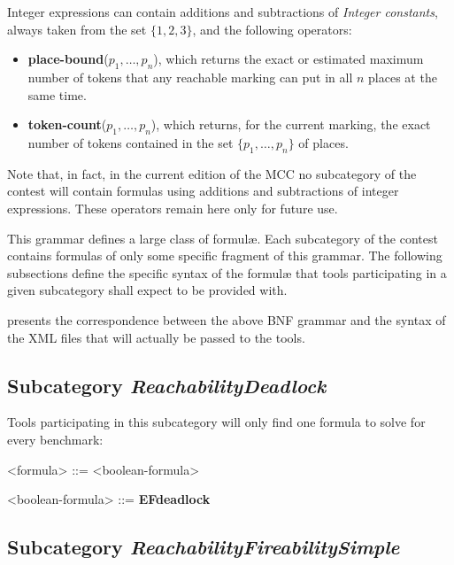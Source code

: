 \documentclass[10pt,english,a4paper]{article}
\newcommand\set[1]           {{\{ #1 \mathclose \}}}
\newcommand\ctle             {\textbf{E}\xspace}
\newcommand\ltlf             {\textbf{F}\xspace}
\newcommand\atomdead         {\textbf{deadlock}\xspace}
\newcommand\atomplacebnd[1]  {\textbf{place-bound}(#1)}
\newcommand\atomtokenscnt[1] {\textbf{token-count}(#1)}
\newcommand{\mcc}[0]{MCC}
\begin{document}
Integer expressions can contain additions and subtractions of
\emph{Integer constants}, always taken from the set $\set{1, 2, 3}$, and
the following operators:
\begin{itemize}
\item
  \atomplacebnd{$p_1, \ldots, p_n$}, which returns the exact or estimated
  maximum number of tokens that any reachable marking can put in all $n$
  places at the same time.
\item
  \atomtokenscnt{$p_1, \ldots, p_n$}, which returns, for the current
  marking, the exact number of tokens contained in the set
  $\set{p_1, \ldots, p_n}$ of places.
\end{itemize}
Note that, in fact, in the current edition of the \mcc{} no subcategory of the
contest will contain formulas using additions and subtractions of integer
expressions. These operators remain here only for future use.


This grammar defines a large class of formulæ.
Each subcategory of the contest contains formulas of only some specific
fragment of this grammar.
The following subsections define the specific syntax of the formul\ae{}
that tools participating in a given subcategory shall expect to be provided
with.

 presents the correspondence between the above BNF grammar
and the syntax of the XML files that will actually be passed to the tools.

\subsection{Subcategory \textit{ReachabilityDeadlock}}

Tools participating in this subcategory will only find one formula to solve
for every benchmark:

\begin{grammar}

<formula> ::= <boolean-formula>

<boolean-formula> ::= \ctle \ltlf \atomdead

\end{grammar}

\subsection{Subcategory \textit{ReachabilityFireabilitySimple}}
\end{document}
